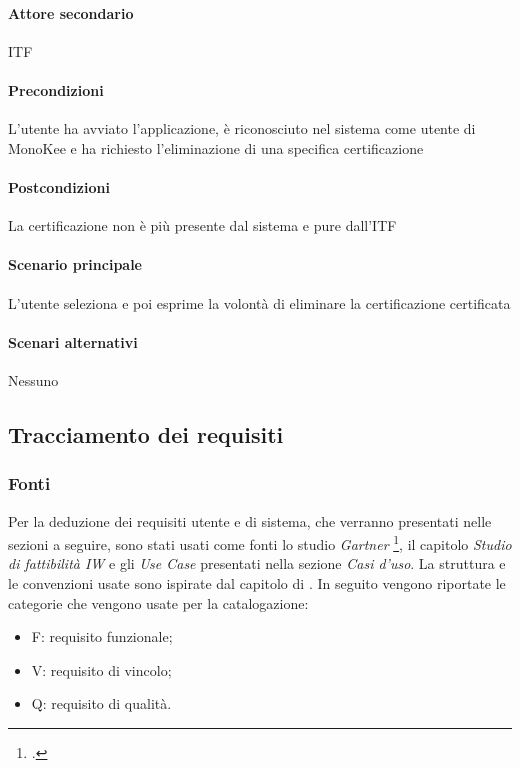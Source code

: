 \paragraph{Attore secondario}  ITF
\paragraph{Precondizioni} L’utente ha avviato l’applicazione, è riconosciuto nel sistema come utente di MonoKee e ha richiesto l’eliminazione di una specifica certificazione
\paragraph{Postcondizioni}  La certificazione non è più presente dal sistema e pure dall’ITF
\paragraph{Scenario principale}  
L’utente seleziona e poi esprime la volontà di eliminare la certificazione certificata
\paragraph{Scenari alternativi}  Nessuno

















\newpage
\subsection{Tracciamento dei requisiti}

\subsubsection{Fonti}
Per la deduzione dei requisiti utente e di sistema, che verranno presentati nelle sezioni a seguire, sono stati usati come fonti lo studio \textit{Gartner} \footcite{farah:The-Dawn-of-Decentralized-Identity}, il capitolo \emph{Studio di fattibilità IW} e gli \textit{Use Case} presentati nella sezione \emph{Casi d'uso}. La struttura e le convenzioni usate sono ispirate dal capitolo di \cite{som:swe}. In seguito vengono riportate le categorie che vengono usate per la catalogazione:
\begin{itemize}
    \item F: requisito funzionale;
    \item V: requisito di vincolo;
    \item Q: requisito di qualità.
\end{itemize}
    
